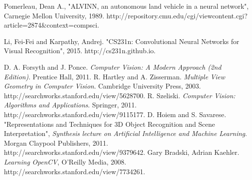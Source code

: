\documentclass[12pt]{article}
\begin{document}
\begin{thebibliography}{1}

Pomerleau, Dean A., "ALVINN, an autonomous land vehicle in a neural network", Carnegie Mellon University, 1989. http://repository.cmu.edu/cgi/viewcontent.cgi?article=2874\&context=compsci.

Li, Fei-Fei and Karpathy, Andrej. "CS231n: Convolutional Neural Networks for Visual Recognition", 2015. http://cs231n.github.io.

D. A. Forsyth and J. Ponce. \emph{Computer Vision: A Modern Approach (2nd Edition)}. Prentice Hall, 2011.
R. Hartley and A. Zisserman. \emph{Multiple View Geometry in Computer Vision}. Cambridge University Press, 2003. http://searchworks.stanford.edu/view/5628700.
R. Szeliski. \emph{Computer Vision: Algorithms and Applications}. Springer, 2011. http://searchworks.stanford.edu/view/9115177.
D. Hoiem and S. Savarese. "Representations and Techniques for 3D Object Recognition and Scene Interpretation", \emph{Synthesis lecture on Artificial Intelligence and Machine Learning}. Morgan Claypool Publishers, 2011. http://searchworks.stanford.edu/view/9379642.
Gary Bradski, Adrian Kaehler. \emph{Learning OpenCV}, O'Reilly Media, 2008. http://searchworks.stanford.edu/view/7734261. 


\end{thebibliography}
\end{document}

